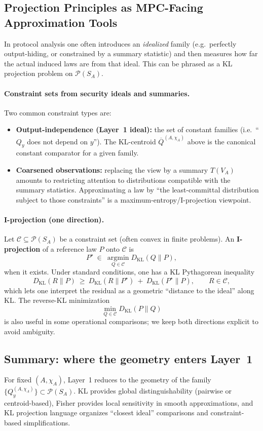 \documentclass[11pt,a4paper]{article}
\theoremstyle{definition}
\theoremstyle{plain}
\newcommand{\Prob}{\mathcal{P}}
\begin{document}
\subsection{Projection Principles as MPC-Facing Approximation Tools}
\label{subsec:kl-projection-principles}
In protocol analysis one often introduces an \emph{idealized} family (e.g.\ perfectly output-hiding, or constrained by a summary statistic) and then measures how far the actual induced laws are from that ideal.
This can be phrased as a KL projection problem on $\Prob(S_A)$.

\paragraph{Constraint sets from security ideals and summaries.}
Two common constraint types are:
\begin{itemize}
    \item \textbf{Output-independence (Layer~1 ideal):} the set of constant families (i.e.\ ``$Q_y$ does not depend on $y$''). The KL-centroid $\overline Q^{(A,\chi_A)}$ above is the canonical constant comparator for a given family.
    \item \textbf{Coarsened observations:} replacing the view by a summary $T(V_A)$ amounts to restricting attention to distributions compatible with the summary statistics. Approximating a law by ``the least-committal distribution subject to those constraints'' is a maximum-entropy/I-projection viewpoint.
\end{itemize}

\paragraph{I-projection (one direction).}
Let $\mathcal{C}\subseteq \Prob(S_A)$ be a constraint set (often convex in finite problems). An \textbf{I-projection} of a reference law $P$ onto $\mathcal{C}$ is
\[
P^{\star}\ \in\ \operatorname*{argmin}_{Q\in \mathcal{C}} D_{\mathrm{KL}}(Q\|P),
\]
when it exists.
Under standard conditions, one has a KL Pythagorean inequality
\[
D_{\mathrm{KL}}(R\|P)\ \ge\ D_{\mathrm{KL}}(R\|P^{\star})\ +\ D_{\mathrm{KL}}(P^{\star}\|P),
\qquad R\in \mathcal{C},
\]
which lets one interpret the residual as a geometric ``distance to the ideal'' along KL.
The reverse-KL minimization
\[
\min_{Q\in\mathcal{C}}D_{\mathrm{KL}}(P\|Q)
\]
is also useful in some operational comparisons; we keep both directions explicit to avoid ambiguity.

\subsection{Summary: where the geometry enters Layer~1}
\label{subsec:info-geometry-layer1-interface}
For fixed $(A,\chi_A)$, Layer~1 reduces to the geometry of the family $\{Q_y^{(A,\chi_A)}\}\subset\Prob(S_A)$.
KL provides global distinguishability (pairwise or centroid-based), Fisher provides local sensitivity in smooth approximations, and KL projection language organizes ``closest ideal'' comparisons and constraint-based simplifications.
\end{document}
